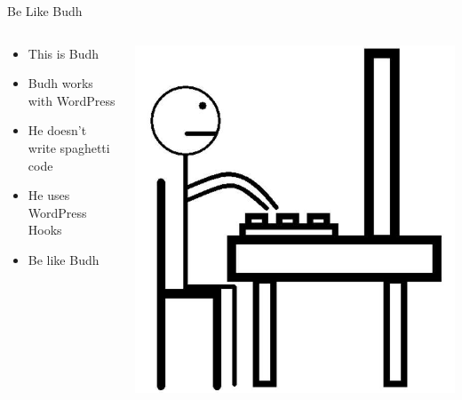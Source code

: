 \documentclass[10pt]{beamer}
\begin{document}
    \begin{frame}{Be Like Budh}
        \begin{columns}
            \begin{column}{0.5\textwidth}
                \begin{itemize}
                    \item[] This is Budh
                    \item[] Budh works with WordPress
                    \item[] He doesn't write spaghetti code
                    \item[] He uses WordPress Hooks
                    \item[] Be like Budh
                \end{itemize}
            \end{column}
            \begin{column}{0.5\textwidth}
                \begin{center}
                    \includegraphics[width=1\textwidth]{images/jamal}
                \end{center}
            \end{column}
        \end{columns}
    \end{frame}
\end{document}
